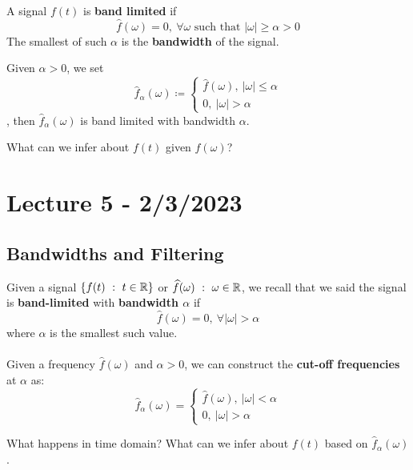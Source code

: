 \documentclass{article}
\begin{document}
\begin{definition}
    A signal $f(t)$ is \textbf{band limited} if 
    \[\widehat{f}(\omega) = 0,\ \forall \omega \text{ such that } |\omega| \geq \alpha > 0\]
    The smallest of such $\alpha$ is the \textbf{bandwidth} of the signal.
\end{definition}

\begin{example}
    Given $\alpha > 0$, we set $$\widehat{f}_\alpha(\omega) \coloneqq \begin{cases} \widehat{f}(\omega),\ |\omega| \leq \alpha\\ 0,\ |\omega| > \alpha \end{cases}$$, then $\widehat{f}_\alpha(\omega)$ is band limited with bandwidth $\alpha$.
\end{example}

\begin{question}
    What can we infer about $f(t)$ given $\widehat{f}(\omega)$?
\end{question}

\newpage
\section{Lecture 5 - 2/3/2023}

\subsection{Bandwidths and Filtering}

Given a signal $\{f(t)\ :\ t \in \mathbb{R}\}$ or $\widehat{f}(\omega)\ :\ \omega \in \Rbb$, we recall that we said the signal is \textbf{band-limited} with \textbf{bandwidth $\alpha$} if
\[\widehat{f}(\omega) = 0,\ \forall |\omega| > \alpha\]
where $\alpha$ is the smallest such value.\\\\

Given a frequency $\widehat{f}(\omega)$ and $\alpha > 0$, we can construct the \textbf{cut-off frequencies} at $\alpha$ as:
\[\widehat{f}_\alpha(\omega) = \begin{cases}
\widehat{f}(\omega),\ |\omega| < \alpha\\
0,\ |\omega| > \alpha
\end{cases}\]

\begin{question}
    What happens in time domain? What can we infer about $f(t)$ based on $\widehat{f}_\alpha(\omega)$.
\end{question}
\end{document}
